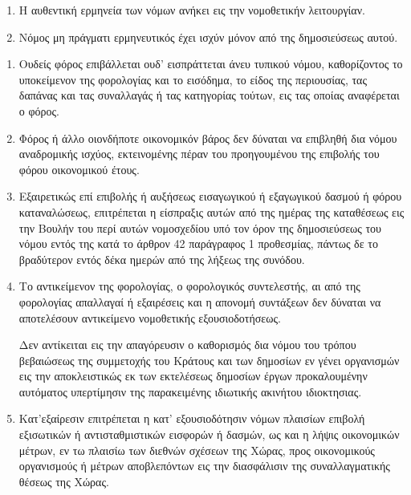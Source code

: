 \documentclass[twoside, a4paper, 10pt]{article}
\begin{document}
\begin{multicols}{2}
\begin{enumerate}
\begin{BigQuote}
\begin{enumerate}
  \item[1.] Η αυθεντική ερμηνεία των νόμων ανήκει  εις την νομοθετικήν λειτουργίαν.
  \item[2.] Νόμος μη πράγματι ερμηνευτικός έχει ισχύν μόνον από της δημοσιεύσεως αυτού.
\end{enumerate}

\begin{enumerate}
  \item[1.] Ουδείς φόρος επιβάλλεται ουδ' εισπράττεται άνευ τυπικού νόμου, καθορίζοντος το υποκείμενον της φορολογίας και το εισόδημα, το είδος της περιουσίας, τας δαπάνας και τας συναλλαγάς ή τας κατηγορίας τούτων, εις τας οποίας αναφέρεται ο φόρος.
  \item[2.] Φόρος ή άλλο οιονδήποτε οικονομικόν βάρος δεν δύναται να επιβληθή δια νόμου αναδρομικής ισχύος, εκτεινομένης πέραν του προηγουμένου της επιβολής του φόρου οικονομικού έτους.
  \item[3.] Εξαιρετικώς επί επιβολής ή αυξήσεως εισαγωγικού ή εξαγωγικού δασμού ή φόρου καταναλώσεως, επιτρέπεται η είσπραξις αυτών από της ημέρας της καταθέσεως εις την Βουλήν του περί αυτών νομοσχεδίου υπό τον όρον της δημοσιεύσεως του νόμου εντός της κατά το άρθρον 42 παράγραφος 1 προθεσμίας, πάντως δε το βραδύτερον εντός δέκα ημερών από της λήξεως της συνόδου.
  \item[4.] Το αντικείμενον της φορολογίας, ο φορολογικός συντελεστής, αι από της φορολογίας απαλλαγαί ή εξαιρέσεις και η απονομή συντάξεων δεν δύναται να αποτελέσουν αντικείμενο νομοθετικής εξουσιοδοτήσεως.

	Δεν αντίκειται εις την απαγόρευσιν ο καθορισμός δια νόμου  του τρόπου βεβαιώσεως της συμμετοχής του Κράτους και των δημοσίων εν γένει οργανισμών εις την αποκλειστικώς εκ των εκτελέσεως δημοσίων έργων προκαλουμένην αυτόματος υπερτίμησιν της παρακειμένης ιδιωτικής ακινήτου ιδιοκτησιας.
  \item[5.] Κατ'εξαίρεσιν επιτρέπεται η κατ' εξουσιοδότησιν νόμων πλαισίων επιβολή  εξισωτικών ή αντισταθμιστικών εισφορών ή δασμών, ως και η λήψις οικονομικών μέτρων, εν τω πλαισίω των διεθνών σχέσεων της Χώρας, προς οικονομικούς οργανισμούς ή μέτρων αποβλεπόντων εις την διασφάλισιν της συναλλαγματικής θέσεως της Χώρας.
\end{enumerate}


\end{BigQuote}
\end{enumerate}
\end{multicols}
\end{document}
